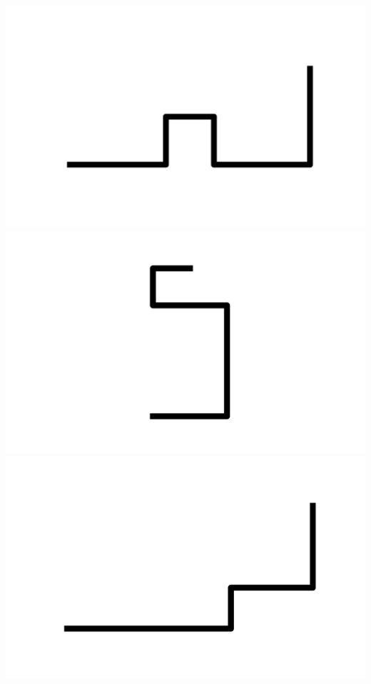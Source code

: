 \documentclass[]{report}
\begin{document}
\includegraphics[scale=.1]{pictures/21/state_cluster_shapes_175.pdf} 
\includegraphics[scale=.1]{pictures/21/state_cluster_shapes_176.pdf} 
\includegraphics[scale=.1]{pictures/21/state_cluster_shapes_177.pdf} 
\end{document}
